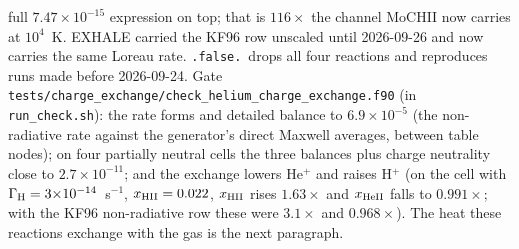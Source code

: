 \documentclass[english,a4paper]{my_memo}
\newcommand{\code}[1]{\texttt{#1}}
\begin{document}
full $7.47{\times}10^{-15}$ expression on top; that is $116\times$ the
channel MoCHII now carries at $10^4$~K.  EXHALE carried the KF96 row
unscaled until 2026-09-26 and now carries the same Loreau rate.  \code{.false.}\ drops all
four reactions and reproduces runs made before 2026-09-24.  Gate
\code{tests/charge\_exchange/check\_helium\_charge\_exchange.f90} (in
\code{run\_check.sh}): the rate forms and detailed balance to
$6.9{\times}10^{-5}$ (the non-radiative rate against the generator's direct
Maxwell averages, between table nodes); on four partially neutral cells the
three balances plus charge neutrality close to $2.7{\times}10^{-11}$; and the
exchange lowers He$^+$ and raises H$^+$ (on the cell with
$\Gamma_{\rm H} = 3{\times}10^{-14}$~s$^{-1}$, $x_{\rm HII} = 0.022$,
$x_{\rm HII}$ rises $1.63\times$ and $x_{\rm HeII}$ falls to $0.991\times$;
with the KF96 non-radiative row these were $3.1\times$ and $0.968\times$).
The heat these reactions exchange with the gas is the next paragraph.
\end{document}
